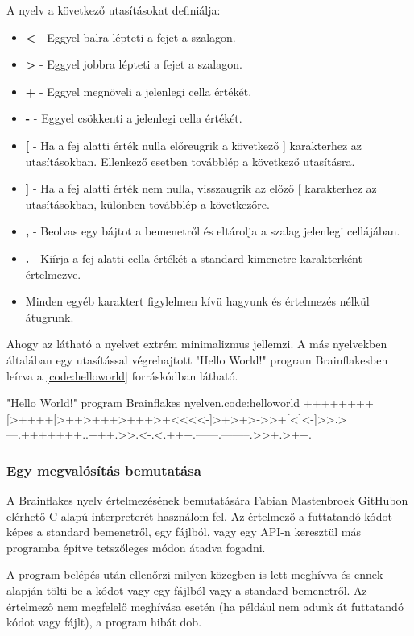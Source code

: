 A nyelv a következő utasításokat definiálja:

\begin{itemize}
    \item \textbf{<} - Eggyel balra lépteti a fejet a szalagon.
    \item \textbf{>} - Eggyel jobbra lépteti a fejet a szalagon.
    \item \textbf{+} - Eggyel megnöveli a jelenlegi cella értékét.
    \item \textbf{-} - Eggyel csökkenti a jelenlegi cella értékét.
    \item \textbf{[} - Ha a fej alatti érték nulla előreugrik a következő ] karakterhez az utasításokban. Ellenkező esetben továbblép a következő utasításra. 
    \item \textbf{]} - Ha a fej alatti érték nem nulla, visszaugrik az előző [ karakterhez az utasításokban, különben továbblép a következőre.
    \item \textbf{,} - Beolvas egy bájtot a bemenetről és eltárolja a szalag jelenlegi cellájában.
    \item \textbf{.} - Kiírja a fej alatti cella értékét a standard kimenetre karakterként értelmezve.
    \item Minden egyéb karaktert figylelmen kívü hagyunk és értelmezés nélkül átugrunk.
\end{itemize}

Ahogy az látható a nyelvet extrém minimalizmus jellemzi. A más nyelvekben általában egy utasítással végrehajtott "Hello World!" program Brainflakesben leírva a \ref{code:helloworld} forráskódban látható.

\begin{code}{"Hello World!" program Brainflakes nyelven.}{code:helloworld}
++++++++[>++++[>++>+++>+++>+<<<<-]>+>+>->>+[<]<-]>>.>---.+++++++..+++.>>.<-.<.+++.------.--------.>>+.>++.
\end{code}

\subsubsection{Egy megvalósítás bemutatása}

A Brainflakes nyelv értelmezésének bemutatására Fabian Mastenbroek GitHubon elérhető C-alapú interpreterét\cite{bfimpl} használom fel. Az értelmező a futtatandó kódot képes a standard bemenetről, egy fájlból, vagy egy API-n keresztül más programba építve tetszőleges módon átadva fogadni.

A program belépés után ellenőrzi milyen közegben is lett meghívva és ennek alapján tölti be a kódot vagy egy fájlból vagy a standard bemenetről. Az értelmező nem megfelelő meghívása esetén (ha például nem adunk át futtatandó kódot vagy fájlt), a program hibát dob. 


